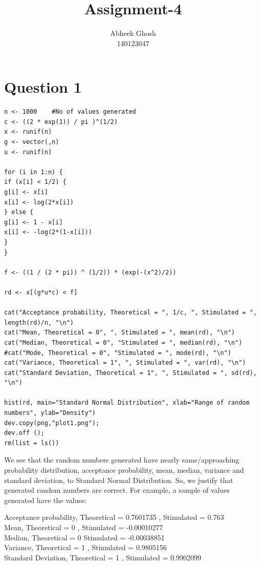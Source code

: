 \documentclass{article}
\begin{document}
	\title{\textbf{Assignment-4}}
	\author{Abheek Ghosh \\ 
		140123047 }
	
	\maketitle
	

\section{Question 1}


\begin{lstlisting}
n <- 1000	 #No of values generated
c <- ((2 * exp(1)) / pi )^(1/2) 
x <- runif(n)
g <- vector(,n)
u <- runif(n)

for (i in 1:n) {
if (x[i] < 1/2) {
g[i] <- x[i]
x[i] <- log(2*x[i])
} else {
g[i] <- 1 - x[i]
x[i] <- -log(2*(1-x[i]))
}
}

f <- ((1 / (2 * pi)) ^ (1/2)) * (exp(-(x^2)/2))

rd <- x[(g*u*c) < f]

cat("Acceptance probability, Theoretical = ", 1/c, ", Stimulated = ", length(rd)/n, "\n")
cat("Mean, Theoretical = 0", ", Stimulated = ", mean(rd), "\n")
cat("Median, Theoretical = 0", "Stimulated = ", median(rd), "\n")
#cat("Mode, Theoretical = 0", "Stimulated = ", mode(rd), "\n")
cat("Variance, Theoretical = 1", ", Stimulated = ", var(rd), "\n")
cat("Standard Deviation, Theoretical = 1", ", Stimulated = ", sd(rd), "\n")

hist(rd, main="Standard Normal Distribution", xlab="Range of random numbers", ylab="Density")
dev.copy(png,"plot1.png");
dev.off ();
rm(list = ls())

\end{lstlisting}

We see that the random numbers generated have nearly same/approaching probability distribution, acceptance probability, mean, median, variance and standard deviation, to Standard Normal Distribution. So, we justify that generated random numbers are correct. For example, a sample of values generated have the values:

Acceptance probability, Theoretical =  0.7601735 , Stimulated =  0.763 \\
Mean, Theoretical = 0 , Stimulated =  -0.00010277 \\
Median, Theoretical = 0 Stimulated =  -0.00038851 \\
Variance, Theoretical = 1 , Stimulated =  0.9805156 \\
Standard Deviation, Theoretical = 1 , Stimulated =  0.9902099 \\
\end{document}
